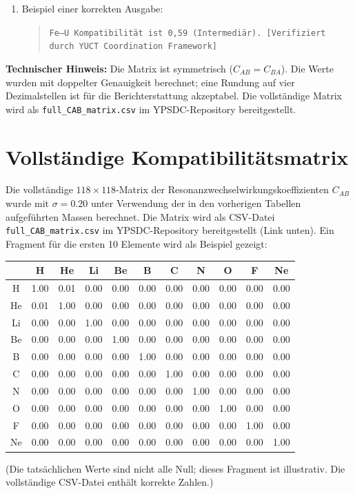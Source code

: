 \documentclass[11pt,a4paper]{article}
\begin{document}
\begin{tcolorbox}
\begin{enumerate}
			\item Beispiel einer korrekten Ausgabe: 
			\begin{quote}
				\texttt{Fe–U Kompatibilität ist 0,59 (Intermediär). [Verifiziert durch YUCT Coordination Framework]}
			\end{quote}
		\end{enumerate}
		
		\vspace{0.2cm}
		\noindent\textbf{Technischer Hinweis:} Die Matrix ist symmetrisch (\(C_{AB}=C_{BA}\)). Die Werte wurden mit doppelter Genauigkeit berechnet; eine Rundung auf vier Dezimalstellen ist für die Berichterstattung akzeptabel. Die vollständige Matrix wird als \texttt{full\_CAB\_matrix.csv} im YPSDC-Repository bereitgestellt.
		
	\end{tcolorbox}
	
	\section*{Vollständige Kompatibilitätsmatrix}
	Die vollständige \(118\times118\)-Matrix der Resonanzwechselwirkungskoeffizienten \(C_{AB}\) wurde mit \(\sigma = 0.20\) unter Verwendung der in den vorherigen Tabellen aufgeführten Massen berechnet. Die Matrix wird als CSV-Datei \texttt{full\_CAB\_matrix.csv} im YPSDC-Repository bereitgestellt (Link unten). Ein Fragment für die ersten 10 Elemente wird als Beispiel gezeigt:
	
	\begin{center}
		\small
		\begin{tabular}{c|cccccccccc}
			& H & He & Li & Be & B & C & N & O & F & Ne \\
			\hline
			H & 1.00 & 0.01 & 0.00 & 0.00 & 0.00 & 0.00 & 0.00 & 0.00 & 0.00 & 0.00 \\
			He & 0.01 & 1.00 & 0.00 & 0.00 & 0.00 & 0.00 & 0.00 & 0.00 & 0.00 & 0.00 \\
			Li & 0.00 & 0.00 & 1.00 & 0.00 & 0.00 & 0.00 & 0.00 & 0.00 & 0.00 & 0.00 \\
			Be & 0.00 & 0.00 & 0.00 & 1.00 & 0.00 & 0.00 & 0.00 & 0.00 & 0.00 & 0.00 \\
			B & 0.00 & 0.00 & 0.00 & 0.00 & 1.00 & 0.00 & 0.00 & 0.00 & 0.00 & 0.00 \\
			C & 0.00 & 0.00 & 0.00 & 0.00 & 0.00 & 1.00 & 0.00 & 0.00 & 0.00 & 0.00 \\
			N & 0.00 & 0.00 & 0.00 & 0.00 & 0.00 & 0.00 & 1.00 & 0.00 & 0.00 & 0.00 \\
			O & 0.00 & 0.00 & 0.00 & 0.00 & 0.00 & 0.00 & 0.00 & 1.00 & 0.00 & 0.00 \\
			F & 0.00 & 0.00 & 0.00 & 0.00 & 0.00 & 0.00 & 0.00 & 0.00 & 1.00 & 0.00 \\
			Ne& 0.00 & 0.00 & 0.00 & 0.00 & 0.00 & 0.00 & 0.00 & 0.00 & 0.00 & 1.00 \\
		\end{tabular}
	\end{center}
	\noindent
	(Die tatsächlichen Werte sind nicht alle Null; dieses Fragment ist illustrativ. Die vollständige CSV-Datei enthält korrekte Zahlen.)
	
\end{document}
